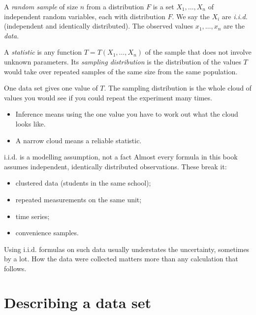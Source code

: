\begin{definition}
A \emph{random sample} of size $n$ from a distribution $F$ is a set $X_1,\dots,X_n$ of independent random variables, each with distribution $F$. We say the $X_i$ are \emph{i.i.d.} (independent and identically distributed). The observed values $x_1,\dots,x_n$ are the \emph{data}.
\end{definition}

\begin{definition}
A \emph{statistic} is any function $T=T(X_1,\dots,X_n)$ of the sample that does not involve unknown parameters. Its \emph{sampling distribution} is the distribution of the values $T$ would take over repeated samples of the same size from the same population.
\end{definition}

\begin{intuition}
One data set gives one value of $T$. The sampling distribution is the whole cloud of values you would see if you could repeat the experiment many times.
\begin{itemize}
  \item Inference means using the one value you have to work out what the cloud looks like.
  \item A narrow cloud means a reliable statistic.
\end{itemize}
\end{intuition}

\begin{pitfall}{i.i.d. is a modelling assumption, not a fact}
Almost every formula in this book assumes independent, identically distributed observations. These break it:
\begin{itemize}
  \item clustered data (students in the same school);
  \item repeated measurements on the same unit;
  \item time series;
  \item convenience samples.
\end{itemize}
Using i.i.d. formulas on such data usually understates the uncertainty, sometimes by a lot. How the data were collected matters more than any calculation that follows.
\end{pitfall}

\section{Describing a data set}

